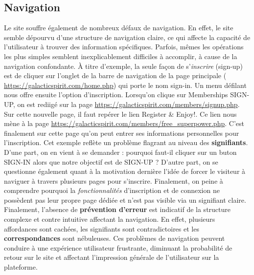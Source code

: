 \documentclass[9pt]{report}
\newcommand{\mathpazott}{\fontfamily{pplj}\selectfont}
\renewcommand{\texttt}[1]{{\scriptsize\mathpazott #1}}
\begin{document}
\begin{multicols*}{2}
  \subsection{Navigation}
  Le site souffre également de nombreux défaux de navigation. En effet, le site 
  semble dépourvu d'une structure de navigation claire, ce qui affecte la 
  capacité de l'utilisateur à trouver des information spécifiques. Parfois, 
  mêmes les opérations les plus simples semblent inexplicablement difficiles 
  à accomplir, à cause de la navigation confondante. À titre d'exemple, 
  la seule façon de s'\textit{inscrire}   (\texttt{sign-up}) est de cliquer 
  sur l'onglet de la barre de navigation de la page principale 
  (  \href{https://galacticspirit.com/home.php}{\texttt{https://galacticspirit.com/home.php}})
  qui porte le nom \texttt{sign-in}.  
  Un menu défilant nous offre ensuite l'option d'inscription. Lorsqu'on 
  clique sur \texttt{Memberships SIGN-UP}, on est rediigé sur la page 
  \href{https://galacticspirit.com/members/signup.php}{\texttt{https://galacticspirit.com/members/signup.php}}. Sur cette nouvelle page, il faut repérer le lien 
  \texttt{Register \& Enjoy!}. Ce lien nous mène à la page 
  \href{https://galacticspirit.com/members/free_superpower.php}{\texttt{https://galacticspirit.com/members/free\_superpower.php}}. C'est finalement sur cette page 
  qu'on peut entrer ses informations personnelles pour l'inscription. Cet exemple 
  reflète un problème flagrant au niveau des \textbf{signifiants}. D'une part, on en 
  vient à se demander : pourquoi faut-il cliquer sur un  buton 
  \texttt{SIGN-IN} alors que notre objectif est de \texttt{SIGN-UP} ? 
  D'autre part, on se questionne également quant 
  à la motivation dernière l'idée de forcer le visiteur à naviguer à travers plusieurs 
  pages pour s'inscrire. Finalement, on peine à comprendre pourquoi 
  la \textit{fonctionnalités} d'inscription et de connexion ne possèdent pas 
  leur propre page dédiée et n'est pas visible via un signifiant claire. Finalement, 
  l'absence de \textbf{prévention d'erreur} est indicatif de la structure 
  complexe et contre intuitive affectant la navigation. En effet, plusieurs 
  affordances sont cachées, les signifiants sont contradictoires et les 
  \textbf{correspondances} sont nébuleuses. 
  Ces problèmes de navigation peuvent conduire à une expérience utilisateur frustrante, 
  diminuant la probabilité de retour sur le site et affectant l'impression générale de 
  l'utilisateur sur la plateforme.



\end{multicols*}
\end{document}
